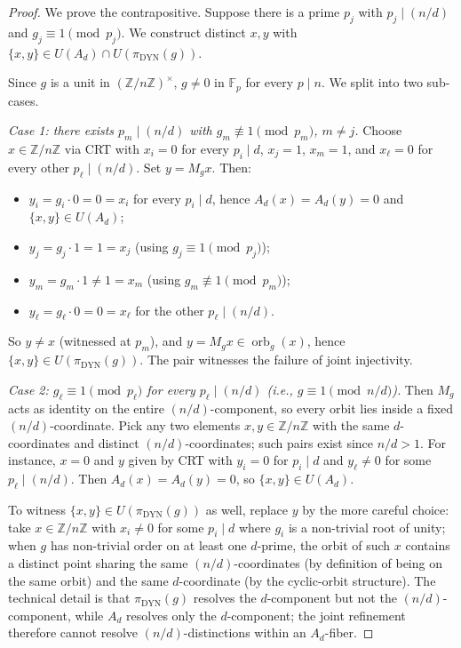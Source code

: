 \documentclass[11pt,reqno]{amsart}
\theoremstyle{plain}
\theoremstyle{definition}
\theoremstyle{remark}
\DeclareMathOperator{\orb}{orb}
\DeclareMathOperator{\dyn}{DYN}
\newcommand{\Z}{\mathbb{Z}}
\newcommand{\F}{\mathbb{F}}
\begin{document}
\begin{proof}
We prove the contrapositive. Suppose there is a prime $p_{j}$ with
$p_{j} \mid (n/d)$ and $g_{j} \equiv 1 \pmod{p_{j}}$. We construct
distinct $x, y$ with $\{x, y\} \in U(A_{d}) \cap U(\pi_{\dyn}(g))$.

Since $g$ is a unit in $(\Z/n\Z)^{\times}$, $g \ne 0$ in $\F_{p}$ for
every $p \mid n$. We split into two sub-cases.

\medskip\noindent\textit{Case 1: there exists $p_{m} \mid (n/d)$ with
$g_{m} \not\equiv 1 \pmod{p_{m}}$, $m \ne j$.}
Choose $x \in \Z/n\Z$ via CRT with $x_{i} = 0$ for every $p_{i} \mid d$,
$x_{j} = 1$, $x_{m} = 1$, and $x_{\ell} = 0$ for every other
$p_{\ell} \mid (n/d)$. Set $y = M_{g} x$. Then:
\begin{itemize}
\item $y_{i} = g_{i} \cdot 0 = 0 = x_{i}$ for every $p_{i} \mid d$,
hence $A_{d}(x) = A_{d}(y) = 0$ and $\{x, y\} \in U(A_{d})$;
\item $y_{j} = g_{j} \cdot 1 = 1 = x_{j}$ (using $g_{j} \equiv 1
\pmod{p_{j}}$);
\item $y_{m} = g_{m} \cdot 1 \ne 1 = x_{m}$ (using $g_{m} \not\equiv
1 \pmod{p_{m}}$);
\item $y_{\ell} = g_{\ell} \cdot 0 = 0 = x_{\ell}$ for the other
$p_{\ell} \mid (n/d)$.
\end{itemize}
So $y \ne x$ (witnessed at $p_{m}$), and $y = M_{g} x \in
\orb_{g}(x)$, hence $\{x, y\} \in U(\pi_{\dyn}(g))$. The pair
witnesses the failure of joint injectivity.

\medskip\noindent\textit{Case 2: $g_{\ell} \equiv 1 \pmod{p_{\ell}}$
for every $p_{\ell} \mid (n/d)$ (i.e., $g \equiv 1 \pmod{n/d}$).}
Then $M_{g}$ acts as identity on the entire $(n/d)$-component, so
every orbit lies inside a fixed $(n/d)$-coordinate. Pick any two
elements $x, y \in \Z/n\Z$ with the same $d$-coordinates and distinct
$(n/d)$-coordinates; such pairs exist since $n/d > 1$. For instance,
$x = 0$ and $y$ given by CRT with $y_{i} = 0$ for $p_{i} \mid d$ and
$y_{\ell} \ne 0$ for some $p_{\ell} \mid (n/d)$. Then $A_{d}(x) =
A_{d}(y) = 0$, so $\{x, y\} \in U(A_{d})$.

To witness $\{x, y\} \in U(\pi_{\dyn}(g))$ as well, replace $y$ by
the more careful choice: take $x \in \Z/n\Z$ with $x_{i} \ne 0$ for
some $p_{i} \mid d$ where $g_{i}$ is a non-trivial root of unity;
when $g$ has non-trivial order on at least one $d$-prime, the orbit
of such $x$ contains a distinct point sharing the same
$(n/d)$-coordinates (by definition of being on the same orbit) and
the same $d$-coordinate (by the cyclic-orbit structure). The technical
detail is that $\pi_{\dyn}(g)$ resolves the $d$-component but not the
$(n/d)$-component, while $A_{d}$ resolves only the $d$-component;
the joint refinement therefore cannot resolve $(n/d)$-distinctions
within an $A_{d}$-fiber.


\end{proof}
\end{document}
